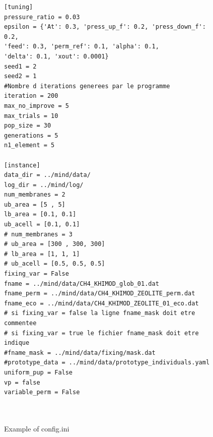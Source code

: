 \documentclass[12pt]{article}
\theoremstyle{definition}
\theoremstyle{definition}
\theoremstyle{remark}
\theoremstyle{remark}
\theoremstyle{definition}
\theoremstyle{remark}
\begin{document}
\begin{figure}[ht]
	
\begin{mdframed}
	\begin{verbatim}
[tuning]
pressure_ratio = 0.03
epsilon = {'At': 0.3, 'press_up_f': 0.2, 'press_down_f': 0.2, 
'feed': 0.3, 'perm_ref': 0.1, 'alpha': 0.1, 
'delta': 0.1, 'xout': 0.0001}
seed1 = 2
seed2 = 1
#Nombre d iterations generees par le programme
iteration = 200 
max_no_improve = 5
max_trials = 10
pop_size = 30
generations = 5
n1_element = 5

[instance]
data_dir = ../mind/data/
log_dir = ../mind/log/
num_membranes = 2
ub_area = [5 , 5]
lb_area = [0.1, 0.1]
ub_acell = [0.1, 0.1]
# num_membranes = 3
# ub_area = [300 , 300, 300]
# lb_area = [1, 1, 1]
# ub_acell = [0.5, 0.5, 0.5]
fixing_var = False
fname = ../mind/data/CH4_KHIMOD_glob_01.dat
fname_perm = ../mind/data/CH4_KHIMOD_ZEOLITE_perm.dat
fname_eco = ../mind/data/CH4_KHIMOD_ZEOLITE_01_eco.dat
# si fixing_var = false la ligne fname_mask doit etre commentee
# si fixing_var = true le fichier fname_mask doit etre indique
#fname_mask = ../mind/data/fixing/mask.dat
#prototype_data = ../mind/data/prototype_individuals.yaml
uniform_pup = False
vp = false
variable_perm = False

		
	\end{verbatim}
	
\end{mdframed}
	\caption{Example of config.ini}
\end{figure}
\end{document}
